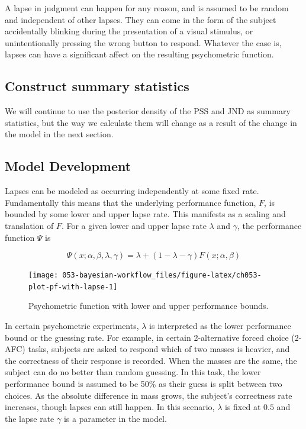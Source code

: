 \documentclass[11pt, oneside, openany]{scrbook}
\begin{document}
A lapse in judgment can happen for any reason, and is assumed to be random and independent of other lapses. They can come in the form of the subject accidentally blinking during the presentation of a visual stimulus, or unintentionally pressing the wrong button to respond. Whatever the case is, lapses can have a significant affect on the resulting psychometric function.

\hypertarget{construct-summary-statistics}{%
\subsection{Construct summary statistics}\label{construct-summary-statistics}}

We will continue to use the posterior density of the PSS and JND as summary statistics, but the way we calculate them will change as a result of the change in the model in the next section.

\hypertarget{model-development}{%
\subsection{Model Development}\label{model-development}}

Lapses can be modeled as occurring independently at some fixed rate. Fundamentally this means that the underlying performance function, \(F\), is bounded by some lower and upper lapse rate. This manifests as a scaling and translation of \(F\). For a given lower and upper lapse rate \(\lambda\) and \(\gamma\), the performance function \(\Psi\) is

\[
\Psi(x; \alpha, \beta, \lambda, \gamma) = \lambda + (1 - \lambda - \gamma) F(x; \alpha, \beta)
\]

\begin{figure}

{\centering \texttt{[image: 053-bayesian-workflow\_files/figure-latex/ch053-plot-pf-with-lapse-1]} 

}

\caption{Psychometric function with lower and upper performance bounds.}\label{fig:ch053-plot-pf-with-lapse}
\end{figure}

In certain psychometric experiments, \(\lambda\) is interpreted as the lower performance bound or the guessing rate. For example, in certain 2-alternative forced choice (2-AFC) tasks, subjects are asked to respond which of two masses is heavier, and the correctness of their response is recorded. When the masses are the same, the subject can do no better than random guessing. In this task, the lower performance bound is assumed to be 50\% as their guess is split between two choices. As the absolute difference in mass grows, the subject's correctness rate increases, though lapses can still happen. In this scenario, \(\lambda\) is fixed at \(0.5\) and the lapse rate \(\gamma\) is a parameter in the model.
\end{document}
